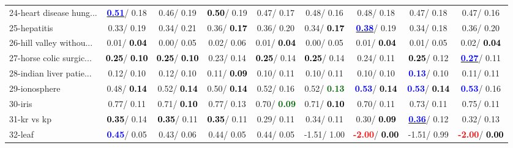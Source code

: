 \begin{table}[h]
\begin{center}
\begin{tabular}{lc|c|c|c|c|c|c|c}
24-heart disease hung... & \underline{\textcolor{blue}{\textbf{  0.51}}}/  0.18 &   0.46/  0.19 & \textcolor{black}{\textbf{  0.50}}/  0.19 &   0.47/  0.17 &   0.48/  0.16 &   0.48/  0.18 &   0.47/  0.18 &   0.47/  0.16 \\
25-hepatitis &   0.33/  0.19 &   0.34/  0.21 &   0.36/\textcolor{black}{\textbf{  0.17}} &   0.36/  0.20 &   0.34/\textcolor{black}{\textbf{  0.17}} & \underline{\textcolor{blue}{\textbf{  0.38}}}/  0.19 &   0.34/  0.18 &   0.36/  0.20 \\
26-hill valley withou... &   0.01/\textcolor{black}{\textbf{  0.04}} &   0.00/  0.05 &   0.02/  0.06 &   0.01/\textcolor{black}{\textbf{  0.04}} &   0.00/  0.05 &   0.01/\textcolor{black}{\textbf{  0.04}} &   0.01/  0.05 &   0.02/\textcolor{black}{\textbf{  0.04}} \\
27-horse colic surgic... & \textcolor{black}{\textbf{  0.25}}/\textcolor{black}{\textbf{  0.10}} & \textcolor{black}{\textbf{  0.25}}/\textcolor{black}{\textbf{  0.10}} &   0.23/  0.14 & \textcolor{black}{\textbf{  0.25}}/  0.14 & \textcolor{black}{\textbf{  0.25}}/  0.14 &   0.24/  0.11 & \textcolor{black}{\textbf{  0.25}}/  0.12 & \underline{\textcolor{blue}{\textbf{  0.27}}}/  0.11 \\
28-indian liver patie... &   0.12/  0.10 &   0.12/  0.10 &   0.11/\textcolor{black}{\textbf{  0.09}} &   0.10/  0.11 &   0.10/  0.11 &   0.10/  0.10 & \textcolor{blue}{\textbf{  0.13}}/  0.10 &   0.11/  0.11 \\ \hline
29-ionosphere &   0.48/\textcolor{black}{\textbf{  0.14}} &   0.52/\textcolor{black}{\textbf{  0.14}} &   0.50/\textcolor{black}{\textbf{  0.14}} &   0.52/  0.16 &   0.52/\textcolor{darkgreen}{\textbf{  0.13}} & \textcolor{blue}{\textbf{  0.53}}/\textcolor{black}{\textbf{  0.14}} & \textcolor{blue}{\textbf{  0.53}}/\textcolor{black}{\textbf{  0.14}} & \textcolor{blue}{\textbf{  0.53}}/  0.16 \\
30-iris &   0.77/  0.11 &   0.71/\textcolor{black}{\textbf{  0.10}} &   0.77/  0.13 &   0.70/\textcolor{darkgreen}{\textbf{  0.09}} &   0.71/\textcolor{black}{\textbf{  0.10}} &   0.70/  0.11 &   0.73/  0.11 &   0.75/  0.11 \\
31-kr vs kp & \textcolor{black}{\textbf{  0.35}}/  0.14 & \textcolor{black}{\textbf{  0.35}}/  0.11 & \textcolor{black}{\textbf{  0.35}}/  0.11 &   0.29/  0.11 &   0.34/  0.11 &   0.30/\textcolor{black}{\textbf{  0.09}} & \underline{\textcolor{blue}{\textbf{  0.36}}}/  0.12 &   0.32/  0.13 \\
32-leaf & \textcolor{blue}{\textbf{  0.45}}/  0.05 &   0.43/  0.06 &   0.44/  0.05 &   0.44/  0.05 &  -1.51/  1.00 & \textcolor{red}{\textbf{ -2.00}}/\textcolor{black}{\textbf{  0.00}} &  -1.51/  0.99 & \textcolor{red}{\textbf{ -2.00}}/\textcolor{black}{\textbf{  0.00}} \\\end{tabular}\label{stratsALCKappa0bIELM}
\end{center}
\end{table}

